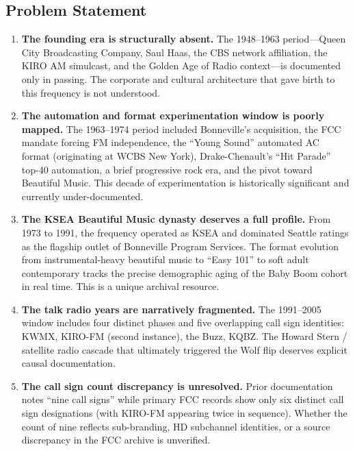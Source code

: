 \documentclass[11pt,letterpaper]{article}
\begin{document}
\subsection{Problem Statement}

\begin{enumerate}[leftmargin=2em]
  \item \textbf{The founding era is structurally absent.} The 1948--1963 period---Queen City Broadcasting Company, Saul Haas, the CBS network affiliation, the KIRO AM simulcast, and the Golden Age of Radio context---is documented only in passing. The corporate and cultural architecture that gave birth to this frequency is not understood.

  \item \textbf{The automation and format experimentation window is poorly mapped.} The 1963--1974 period included Bonneville's acquisition, the FCC mandate forcing FM independence, the ``Young Sound'' automated AC format (originating at WCBS New York), Drake-Chenault's ``Hit Parade'' top-40 automation, a brief progressive rock era, and the pivot toward Beautiful Music. This decade of experimentation is historically significant and currently under-documented.

  \item \textbf{The KSEA Beautiful Music dynasty deserves a full profile.} From 1973 to 1991, the frequency operated as KSEA and dominated Seattle ratings as the flagship outlet of Bonneville Program Services. The format evolution from instrumental-heavy beautiful music to ``Easy 101'' to soft adult contemporary tracks the precise demographic aging of the Baby Boom cohort in real time. This is a unique archival resource.

  \item \textbf{The talk radio years are narratively fragmented.} The 1991--2005 window includes four distinct phases and five overlapping call sign identities: KWMX, KIRO-FM (second instance), the Buzz, KQBZ. The Howard Stern / satellite radio cascade that ultimately triggered the Wolf flip deserves explicit causal documentation.

  \item \textbf{The call sign count discrepancy is unresolved.} Prior documentation notes ``nine call signs'' while primary FCC records show only six distinct call sign designations (with KIRO-FM appearing twice in sequence). Whether the count of nine reflects sub-branding, HD subchannel identities, or a source discrepancy in the FCC archive is unverified.
\end{enumerate}
\end{document}
